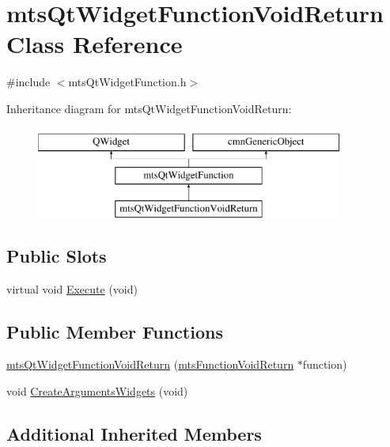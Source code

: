 \hypertarget{classmts_qt_widget_function_void_return}{\section{mts\-Qt\-Widget\-Function\-Void\-Return Class Reference}
\label{classmts_qt_widget_function_void_return}
}


{\ttfamily \#include $<$mts\-Qt\-Widget\-Function.\-h$>$}

Inheritance diagram for mts\-Qt\-Widget\-Function\-Void\-Return\-:\begin{figure}[H]
\begin{center}
\leavevmode
\includegraphics[height=3.000000cm]{de/daa/classmts_qt_widget_function_void_return}
\end{center}
\end{figure}
\subsection*{Public Slots}
\begin{DoxyCompactItemize}
\item 
virtual void \hyperlink{classmts_qt_widget_function_void_return_ac05a5c451c222c9b8919930a520bd4e9}{Execute} (void)
\end{DoxyCompactItemize}
\subsection*{Public Member Functions}
\begin{DoxyCompactItemize}
\item 
\hyperlink{classmts_qt_widget_function_void_return_ae526c0e3e406d7c36544a59de610d9f3}{mts\-Qt\-Widget\-Function\-Void\-Return} (\hyperlink{classmts_function_void_return}{mts\-Function\-Void\-Return} $\ast$function)
\item 
void \hyperlink{classmts_qt_widget_function_void_return_ac71dd8453c8b9ee0edc729076cfd7081}{Create\-Arguments\-Widgets} (void)
\end{DoxyCompactItemize}
\subsection*{Additional Inherited Members}


